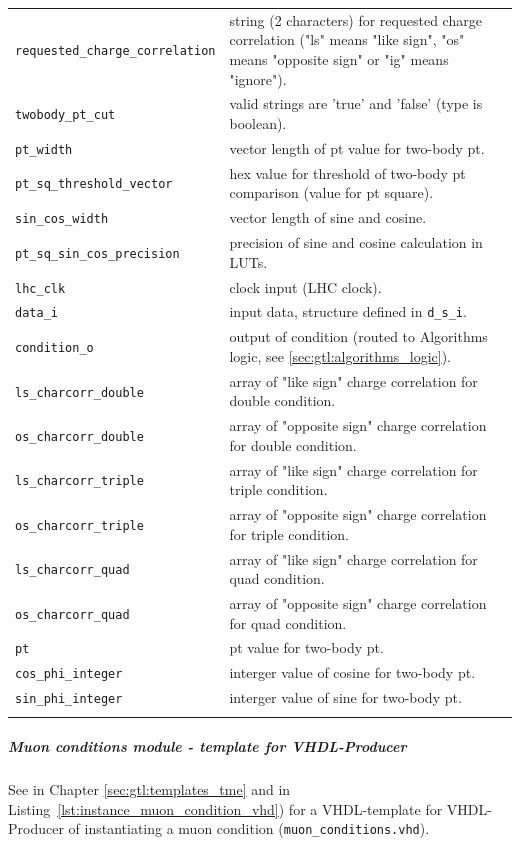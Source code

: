 \begin{longtable}{>{\footnotesize}l >{\footnotesize}p{}}
\verb|requested_charge_correlation| & string (2 characters) for requested charge correlation ("ls" means "like sign", "os" means "opposite sign" or "ig" means "ignore").\\
\verb|twobody_pt_cut| & valid strings are 'true' and 'false' (type is boolean).\\
\verb|pt_width| & vector length of pt value for two-body pt.\\
\verb|pt_sq_threshold_vector| & hex value for threshold of two-body pt comparison (value for pt square).\\
\verb|sin_cos_width| & vector length of sine and cosine.\\
\verb|pt_sq_sin_cos_precision| & precision of sine and cosine calculation in LUTs.\\
\verb|lhc_clk| & clock input (LHC clock).\\
\verb|data_i| & input data, structure defined in \texttt{d\_s\_i}.\\
\verb|condition_o| & output of condition (routed to Algorithms logic, see \ref{sec:gtl:algorithms_logic}).\\
\verb|ls_charcorr_double| & array of "like sign" charge correlation for double condition.\\
\verb|os_charcorr_double| & array of "opposite sign" charge correlation for double condition.\\
\verb|ls_charcorr_triple| & array of "like sign" charge correlation for triple condition.\\
\verb|os_charcorr_triple| & array of "opposite sign" charge correlation for triple condition.\\
\verb|ls_charcorr_quad| & array of "like sign" charge correlation for quad condition.\\
\verb|os_charcorr_quad| & array of "opposite sign" charge correlation for quad condition.\\
\verb|pt| & pt value for two-body pt.\\
\verb|cos_phi_integer| & interger value of cosine for two-body pt.\\
\verb|sin_phi_integer| & interger value of sine for two-body pt.\\
\hline 
\label{tab:gtl:explanation_muon_conditions_vhd}
\end{longtable}

\clearpage

\subparagraph{Muon conditions module - template for VHDL-Producer}
See in Chapter \ref{sec:gtl:templates_tme} and in Listing~\ref{lst:instance_muon_condition_vhd}) for a VHDL-template for VHDL-Producer of
instantiating a muon condition (\texttt{muon\_conditions.vhd}).\\

